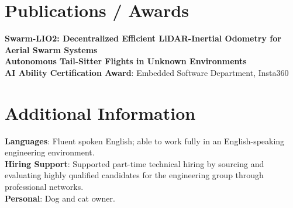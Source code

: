 \documentclass[letterpaper,11pt]{article}
\begin{document}
\section{Publications / Awards}
  \begin{itemize}[leftmargin=0.15in, label={}]
    \small{\item{
      \textbf{Swarm-LIO2: Decentralized Efficient LiDAR-Inertial Odometry for Aerial Swarm Systems} \\
      \textbf{Autonomous Tail-Sitter Flights in Unknown Environments} \\
      \textbf{AI Ability Certification Award}{: Embedded Software Department, Insta360}
    }}
 \end{itemize}

\section{Additional Information}
  \begin{itemize}[leftmargin=0.15in, label={}]
    \small{\item{
      \textbf{Languages}{: Fluent spoken English; able to work fully in an English-speaking engineering environment.} \\
      \textbf{Hiring Support}{: Supported part-time technical hiring by sourcing and evaluating highly qualified candidates for the engineering group through professional networks.} \\
      \textbf{Personal}{: Dog and cat owner.}
    }}
 \end{itemize}

\end{document}
